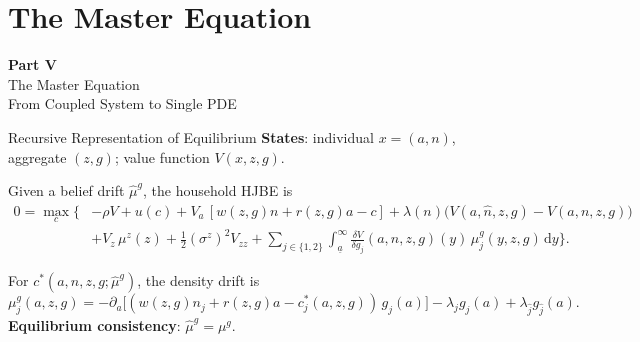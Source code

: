 \documentclass[aspectratio=169,11pt]{beamer}
\newcommand{\ud}{\,\mathrm{d}}
\newcommand{\ubar}[1]{\underline{#1}}
\begin{document}

\section{The Master Equation}

\begin{frame}{}
\vfill
\begin{center}
{\Huge \textcolor{uzhblue}{\textbf{Part V}}}\\[12pt]
{\LARGE The Master Equation}\\[6pt]
{\large From Coupled System to Single PDE}
\end{center}
\vfill
\end{frame}

\begin{frame}{Recursive Representation of Equilibrium}
\footnotesize
\textbf{States}: individual $x=(a,n)$, aggregate $(z,g)$; value function $V(x,z,g)$.

\vspace{0.1em}
Given a belief drift $\hat\mu^g$, the household HJBE is
\[
\begin{aligned}
0=\max_c\Big\{&-\rho V + u(c) + V_a\,[w(z,g)n+r(z,g)a-c] + \lambda(n)\big(V(a,\hat n,z,g)-V(a,n,z,g)\big)\\
&+V_z\,\mu^z(z)+\tfrac12(\sigma^z)^2V_{zz}
+\sum_{j\in\{1,2\}}\int_{\ubar a}^{\infty}
\frac{\delta V}{\delta g_j}(a,n,z,g)(y)\,\hat\mu^g_j(y,z,g)\ud y
\Big\}.
\end{aligned}
\]

\vspace{-0.2em}
For $c^*(a,n,z,g;\hat\mu^g)$, the density drift is
\[
\mu^g_j(a,z,g)= -\partial_a\!\big[(w(z,g)n_j+r(z,g)a-c^*_j(a,z,g))\,g_j(a)\big]
-\lambda_j g_j(a)+\lambda_{\hat j} g_{\hat j}(a).
\]
\textbf{Equilibrium consistency}: $\hat\mu^g=\mu^g$.
\end{frame}
\end{document}
